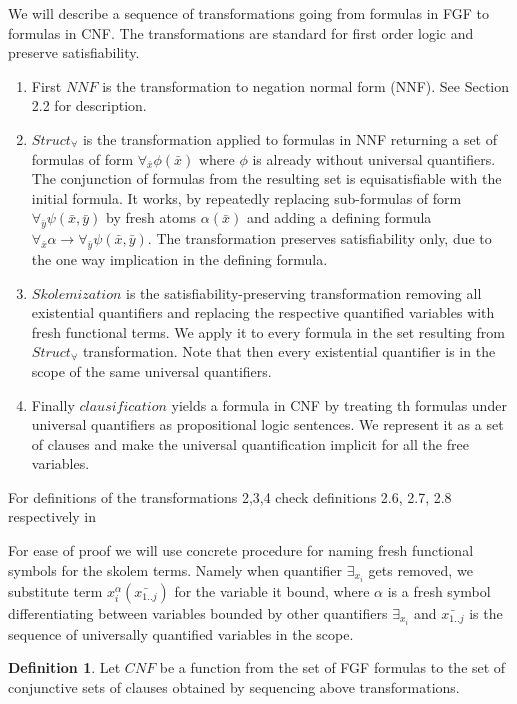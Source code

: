 \documentclass[english, shortabstract]{iithesis}
\theoremstyle{definition} \newtheorem{definition}{Definition}[chapter]
\theoremstyle{remark} \newtheorem{remark}[definition]{Observation}
\theoremstyle{plain} \newtheorem{theorem}[definition]{Theorem}
\theoremstyle{plain} \newtheorem{lemma}[definition]{Lemma}
\begin{document}
We will describe a sequence of transformations going from formulas in FGF to formulas in CNF.
The transformations are standard for first order logic and preserve satisfiability.
\begin{enumerate}
    \item First $NNF$ is the transformation to negation normal form (NNF). See \cite{resolution book} Section 2.2 for description.
    \item $Struct_{\forall}$ is the transformation applied to formulas in NNF returning a set of formulas of form $\forall_{\bar{x}}\phi(\bar{x})$ where $\phi$ is already without universal quantifiers. The conjunction of formulas from the resulting set is equisatisfiable with the initial formula.
    It works, by repeatedly replacing sub-formulas of form $\forall_{\bar{y}} \psi(\bar{x},\bar{y})$ 
    by fresh atoms $\alpha(\bar{x})$ and adding a defining formula $\forall_{\bar{x}} \alpha \rightarrow \forall_{\bar{y}} \psi(\bar{x},\bar{y})$.
    The transformation preserves satisfiability only, due to the one way implication in the defining formula.
    \item $Skolemization$ is the satisfiability-preserving transformation removing all existential quantifiers and replacing the respective quantified variables with fresh functional terms.
    We apply it to every formula in the set resulting from $Struct_\forall$ transformation.
    Note that then every existential quantifier is in the scope of the same universal quantifiers.
    \item Finally $clausification$ yields a formula in CNF by treating th formulas under universal quantifiers as propositional logic sentences. We represent it as a set of clauses and make the universal quantification implicit for all the free variables. 
\end{enumerate}

For definitions of the transformations 2,3,4 check definitions 2.6, 2.7, 2.8 respectively in \cite{resolution GF}

For ease of proof we will use concrete procedure for naming fresh functional symbols for the skolem terms.
Namely when quantifier $\exists_{x_i}$ gets removed, we substitute term $x_i^{\alpha}(\bar{x_{1..j}})$ for the variable it bound, 
where $\alpha$ is a fresh symbol differentiating between variables bounded by other quantifiers $\exists_{x_i}$ and $\bar{x_{1..j}}$ is the sequence of universally quantified variables in the scope.

\begin{definition}
Let $CNF$ be a function from the set of FGF formulas to the set of conjunctive sets of clauses obtained by sequencing above transformations.
\end{definition}
\end{document}
